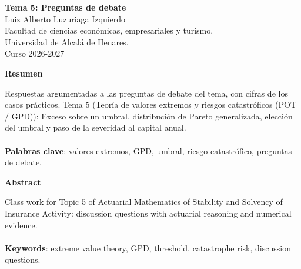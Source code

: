 \documentclass[a4paper,12pt]{article}
\begin{document}
\begin{titlepage}
    \centering
    \vspace*{0.1cm}
    \huge\textbf{Tema 5: Preguntas de debate}\\
    \vspace{1cm}
    \small{Luiz Alberto Luzuriaga Izquierdo}\\
    \vspace{0.1cm}
    Facultad de ciencias económicas, empresariales y turismo. \\
    \vspace{0.1cm}
    Universidad de Alcalá de Henares. \\
    \vspace{0.1cm}
    Curso 2026-2027\\
    \vspace{0.5cm}

{\bfseries Resumen}

\vspace{0.1cm}
\noindent
\begin{justify}
Respuestas argumentadas a las preguntas de debate del tema, con cifras de los casos prácticos. Tema 5 (Teoría de valores extremos y riesgos catastróficos (POT / GPD)): Exceso sobre un umbral, distribución de Pareto generalizada, elección del umbral y paso de la severidad al capital anual.\\\\
\vspace{0.1cm}
\noindent
\textbf{Palabras clave}: valores extremos, GPD, umbral, riesgo catastrófico, preguntas de debate.
\end{justify}
\begin{center}
    {\bfseries Abstract}
\end{center}
\vspace{0.1cm}
\noindent
\begin{justify}
Class work for Topic 5 of Actuarial Mathematics of Stability and Solvency of Insurance Activity: discussion questions with actuarial reasoning and numerical evidence.\\\\
\vspace{0.1cm}
\noindent
\textbf{Keywords}: extreme value theory, GPD, threshold, catastrophe risk, discussion questions.
\end{justify}

\end{titlepage}

\newpage{}
\renewcommand{\contentsname}{Índice}
\tableofcontents
\end{document}
